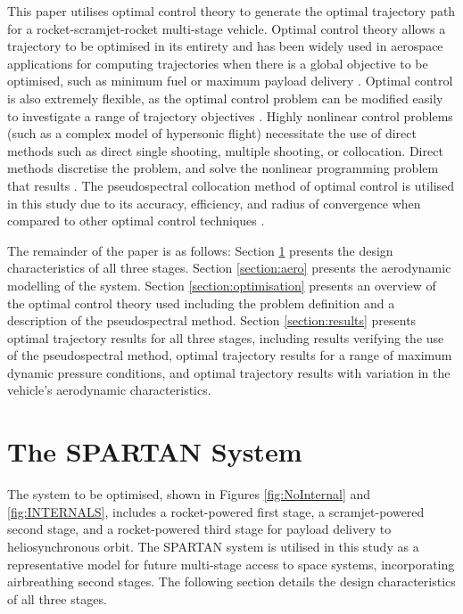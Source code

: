 \documentclass[journal]{new-aiaa}
\begin{document}
This paper utilises optimal control theory to generate the optimal trajectory path for a rocket-scramjet-rocket multi-stage vehicle.
Optimal control theory allows a trajectory to be optimised in its entirety and has been widely used in aerospace applications for computing trajectories when there is a global objective to be optimised, such as minimum fuel or maximum payload delivery \cite{Bedrossian,Josselyn2002,Sekhavat2005}. 
Optimal control is also extremely flexible, as the optimal control problem can be modified easily to investigate a range of trajectory objectives \cite{Ranieri2005}. 
Highly nonlinear control problems (such as a complex model of hypersonic flight) necessitate the use of direct methods such as direct single shooting, multiple shooting, or collocation. 
Direct methods discretise the problem, and solve the nonlinear programming problem that results \cite{Fahroo2000}. 
The pseudospectral collocation method of optimal control is utilised in this study due to its accuracy, efficiency, and radius of convergence when compared to other optimal control techniques \cite{Fahroo2000,Elganar}.

The remainder of the paper is as follows: Section \ref{section:system} presents the design characteristics of all three stages. Section \ref{section:aero} presents the aerodynamic modelling of the system. Section \ref{section:optimisation} presents an overview of the optimal control theory used including the problem definition and a description of the pseudospectral method. Section \ref{section:results} presents optimal trajectory results for all three stages, including results verifying the use of the pseudospectral method, optimal trajectory results for a range of maximum dynamic pressure conditions, and optimal trajectory results with variation in the vehicle's aerodynamic characteristics.

\section{The SPARTAN System} \label{section:system}

The system to be optimised, shown in Figures \ref{fig:NoInternal} and \ref{fig:INTERNALS}, includes a rocket-powered first stage, a scramjet-powered second stage, and a rocket-powered third stage for payload delivery to heliosynchronous orbit. The SPARTAN system \cite{Preller2015a,Jazra2013,Preller2017}  is utilised in this study as a representative model for future multi-stage access to space systems, incorporating airbreathing second stages. The following section details the design characteristics of all three stages.
\end{document}
